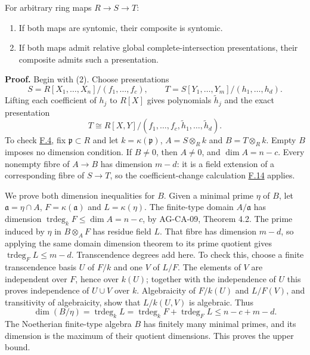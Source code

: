 \documentclass[11pt,a4paper,openany]{report}
\newcounter{none}
\providecommand{\tightlist}{\setlength{\itemsep}{0pt}\setlength{\parskip}{0pt}}
\begin{document}
For arbitrary ring maps \(R\to S\to T\):

\begin{enumerate}
\def\labelenumi{\arabic{enumi}.}
\tightlist
\item
  If both maps are syntomic, their composite is syntomic.
\item
  If both maps admit relative global complete-intersection presentations, their composite admits such a presentation.
\end{enumerate}

\textbf{Proof.} Begin with (2). Choose presentations \[S=R[X_1,\ldots,X_n]/(f_1,\ldots,f_c),\qquad
T=S[Y_1,\ldots,Y_m]/(h_1,\ldots,h_d).\] Lifting each coefficient of \(h_j\) to \(R[X]\) gives polynomials \(\widetilde h_j\) and the exact presentation \[T\cong R[X,Y]/(f_1,\ldots,f_c,\widetilde h_1,\ldots,\widetilde h_d).\] To check \hyperref[AG-RG-S05-algebra-definition-relative-global-complete-intersection]{F.4}, fix \(\mathfrak p\subset R\) and let \(k=\kappa(\mathfrak p)\), \(A=S\otimes_Rk\) and \(B=T\otimes_Rk\). Empty \(B\) imposes no dimension condition. If \(B\ne0\), then \(A\ne0\), and \(\dim A=n-c\). Every nonempty fibre of \(A\to B\) has dimension \(m-d\): it is a field extension of a corresponding fibre of \(S\to T\), so the coefficient-change calculation \hyperref[AG-RG-S05-algebra-lemma-base-change-relative-global-complete-intersection]{F.14} applies.

We prove both dimension inequalities for \(B\). Given a minimal prime \(\eta\) of \(B\), let \(\mathfrak a=\eta\cap A\), \(F=\kappa(\mathfrak a)\) and \(L=\kappa(\eta)\). The finite-type domain \(A/\mathfrak a\) has dimension \(\operatorname{trdeg}_kF\leq\dim A=n-c\), by AG-CA-09, Theorem 4.2. The prime induced by \(\eta\) in \(B\otimes_AF\) has residue field \(L\). That fibre has dimension \(m-d\), so applying the same domain dimension theorem to its prime quotient gives \(\operatorname{trdeg}_FL\leq m-d\). Transcendence degrees add here. To check this, choose a finite transcendence basis \(U\) of \(F/k\) and one \(V\) of \(L/F\). The elements of \(V\) are independent over \(F\), hence over \(k(U)\); together with the independence of \(U\) this proves independence of \(U\cup V\) over \(k\). Algebraicity of \(F/k(U)\) and \(L/F(V)\), and transitivity of algebraicity, show that \(L/k(U,V)\) is algebraic. Thus \[\dim(B/\eta)=\operatorname{trdeg}_kL
=\operatorname{trdeg}_kF+\operatorname{trdeg}_FL
\leq n-c+m-d.\] The Noetherian finite-type algebra \(B\) has finitely many minimal primes, and its dimension is the maximum of their quotient dimensions. This proves the upper bound.
\end{document}
